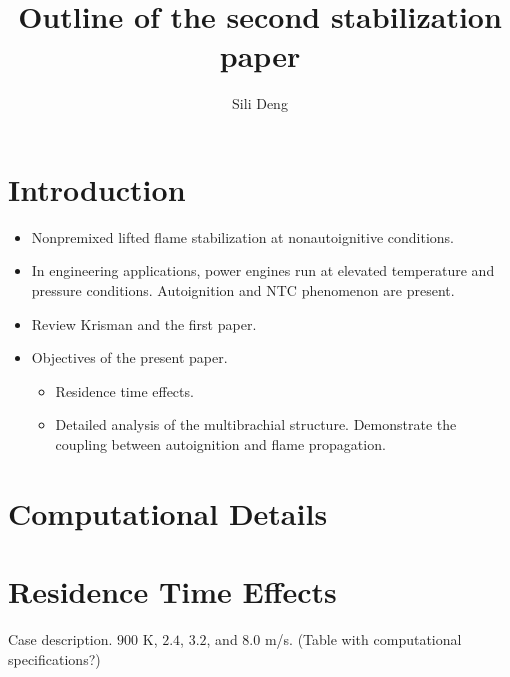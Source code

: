 \documentclass[11pt,english]{article}
\begin{document}
\title{Outline of the second stabilization paper}

\author{Sili Deng}
\maketitle

\section{Introduction}

\begin{itemize}
  \item Nonpremixed lifted flame stabilization at nonautoignitive conditions.
  \item In engineering applications, power engines run at elevated temperature and pressure conditions.  Autoignition and NTC phenomenon are present.
  \item Review Krisman and the first paper.
  \item Objectives of the present paper.
  \begin{itemize}
    \item Residence time effects.
    \item Detailed analysis of the multibrachial structure.  Demonstrate the coupling between autoignition and flame propagation.
  \end{itemize}
\end{itemize}

\section{Computational Details}


\section{Residence Time Effects}

Case description.  $900$ K, $2.4$, $3.2$, and $8.0$ m/s.  (Table with computational specifications?) 
\end{document}
